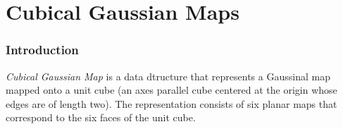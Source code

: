 \chapter{Cubical Gaussian Maps}
\label{chap:cgm_ref}

\subsection*{Introduction}

{\em Cubical Gaussian Map} is a data dtructure that represents a Gaussinal map
mapped onto a unit cube (an axes parallel cube centered at the origin whose
edges are of length two). The representation consists of six planar maps that
correspond to the six faces of the unit cube.
